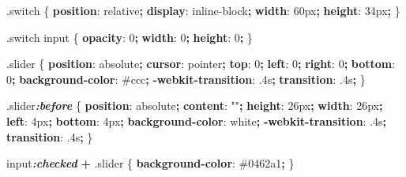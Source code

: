 \documentclass[
]{krantz}
\makeatletter
\newenvironment{Shaded}{\begin{snugshade}}{\end{snugshade}}
\newcommand{\ConstantTok}[1]{\textcolor[rgb]{0,0,0}{#1}}
\newcommand{\DataTypeTok}[1]{\textcolor[rgb]{0.27,0.27,0.27}{#1}}
\newcommand{\DecValTok}[1]{\textcolor[rgb]{0.06,0.06,0.06}{#1}}
\newcommand{\FunctionTok}[1]{\textcolor[rgb]{0,0,0}{#1}}
\newcommand{\InformationTok}[1]{\textcolor[rgb]{0.37,0.37,0.37}{\textbf{\textit{#1}}}}
\newcommand{\KeywordTok}[1]{\textcolor[rgb]{0.27,0.27,0.27}{\textbf{#1}}}
\newcommand{\NormalTok}[1]{#1}
\newcommand{\OperatorTok}[1]{\textcolor[rgb]{0.43,0.43,0.43}{\textbf{#1}}}
\newcommand{\StringTok}[1]{\textcolor[rgb]{0.5,0.5,0.5}{#1}}
\newenvironment{kframe}{%
\medskip{}
\setlength{\fboxsep}{.8em}
 \def\at@end@of@kframe{}%
 \ifinner\ifhmode%
  \def\at@end@of@kframe{\end{minipage}}%
  \begin{minipage}{\columnwidth}%
 \fi\fi%
 \def\FrameCommand##1{\hskip\@totalleftmargin \hskip-\fboxsep
 \colorbox{shadecolor}{##1}\hskip-\fboxsep
     \hskip-\linewidth \hskip-\@totalleftmargin \hskip\columnwidth}%
 \MakeFramed {\advance\hsize-\width
   \@totalleftmargin\z@ \linewidth\hsize
   \@setminipage}}%
 {\par\unskip\endMakeFramed%
 \at@end@of@kframe}
\renewenvironment{Shaded}{\begin{kframe}}{\end{kframe}}
\makeatother
\begin{document}
\begin{Shaded}
\begin{Highlighting}[]
\FunctionTok{.switch}\NormalTok{ \{}
  \KeywordTok{position}\NormalTok{: }\DecValTok{relative}\OperatorTok{;}
  \KeywordTok{display}\NormalTok{: }\DecValTok{inline{-}block}\OperatorTok{;}
  \KeywordTok{width}\NormalTok{: }\DecValTok{60}\DataTypeTok{px}\OperatorTok{;}
  \KeywordTok{height}\NormalTok{: }\DecValTok{34}\DataTypeTok{px}\OperatorTok{;}
\NormalTok{\}}

\FunctionTok{.switch}\NormalTok{ input \{ }
  \KeywordTok{opacity}\NormalTok{: }\DecValTok{0}\OperatorTok{;}
  \KeywordTok{width}\NormalTok{: }\DecValTok{0}\OperatorTok{;}
  \KeywordTok{height}\NormalTok{: }\DecValTok{0}\OperatorTok{;}
\NormalTok{\}}

\FunctionTok{.slider}\NormalTok{ \{}
  \KeywordTok{position}\NormalTok{: }\DecValTok{absolute}\OperatorTok{;}
  \KeywordTok{cursor}\NormalTok{: }\DecValTok{pointer}\OperatorTok{;}
  \KeywordTok{top}\NormalTok{: }\DecValTok{0}\OperatorTok{;}
  \KeywordTok{left}\NormalTok{: }\DecValTok{0}\OperatorTok{;}
  \KeywordTok{right}\NormalTok{: }\DecValTok{0}\OperatorTok{;}
  \KeywordTok{bottom}\NormalTok{: }\DecValTok{0}\OperatorTok{;}
  \KeywordTok{background{-}color}\NormalTok{: }\ConstantTok{\#ccc}\OperatorTok{;}
  \KeywordTok{{-}webkit{-}transition}\NormalTok{: }\DecValTok{.4}\DataTypeTok{s}\OperatorTok{;}
  \KeywordTok{transition}\NormalTok{: }\DecValTok{.4}\DataTypeTok{s}\OperatorTok{;}
\NormalTok{\}}

\FunctionTok{.slider}\InformationTok{:before}\NormalTok{ \{}
  \KeywordTok{position}\NormalTok{: }\DecValTok{absolute}\OperatorTok{;}
  \KeywordTok{content}\NormalTok{: }\StringTok{""}\OperatorTok{;}
  \KeywordTok{height}\NormalTok{: }\DecValTok{26}\DataTypeTok{px}\OperatorTok{;}
  \KeywordTok{width}\NormalTok{: }\DecValTok{26}\DataTypeTok{px}\OperatorTok{;}
  \KeywordTok{left}\NormalTok{: }\DecValTok{4}\DataTypeTok{px}\OperatorTok{;}
  \KeywordTok{bottom}\NormalTok{: }\DecValTok{4}\DataTypeTok{px}\OperatorTok{;}
  \KeywordTok{background{-}color}\NormalTok{: }\ConstantTok{white}\OperatorTok{;}
  \KeywordTok{{-}webkit{-}transition}\NormalTok{: }\DecValTok{.4}\DataTypeTok{s}\OperatorTok{;}
  \KeywordTok{transition}\NormalTok{: }\DecValTok{.4}\DataTypeTok{s}\OperatorTok{;}
\NormalTok{\}}

\NormalTok{input}\InformationTok{:checked} \OperatorTok{+} \FunctionTok{.slider}\NormalTok{ \{}
  \KeywordTok{background{-}color}\NormalTok{: }\ConstantTok{\#0462a1}\OperatorTok{;}
\NormalTok{\}}


\end{Highlighting}
\end{Shaded}
\end{document}
